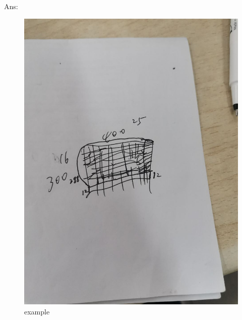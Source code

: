 \documentclass{article}
\begin{document}
Ans:%

\begin{figure}[ht]
\centering
\includegraphics[width=5in]{example}
\caption{example}
\end{figure}



\end{document}
